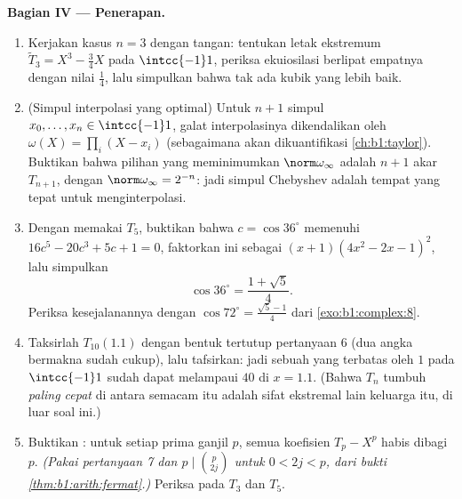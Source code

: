 \begin{problem}
\medskip
\noindent\textbf{Bagian IV --- Penerapan.}
\begin{enumerate}[resume]
  \item Kerjakan kasus $n = 3$ dengan tangan: tentukan letak ekstremum
        $\widetilde T_3 = X^3 - \frac34X$ pada $\intcc{-1}1$,
        periksa ekuiosilasi berlipat empatnya dengan nilai
        $\frac14$, lalu simpulkan bahwa tak ada kubik  yang lebih baik.
  \item (Simpul interpolasi yang optimal) Untuk $n + 1$ simpul $x_0,
        \dots, x_n \in \intcc{-1}1$, galat interpolasinya
        dikendalikan oleh $\omega(X) = \prod_i (X - x_i)$ (sebagaimana
        akan dikuantifikasi \cref{ch:b1:taylor}). Buktikan bahwa pilihan
        yang meminimumkan $\norm\omega_\infty$ adalah  $n + 1$
        akar $T_{n+1}$, dengan $\norm\omega_\infty = 2^{-n}$:
        jadi simpul Chebyshev adalah tempat yang tepat untuk menginterpolasi.
  \item Dengan memakai $T_5$, buktikan bahwa $c = \cos 36^\circ$ memenuhi
        $16c^5 - 20c^3 + 5c + 1 = 0$, faktorkan  ini sebagai
        $(x + 1)(4x^2 - 2x - 1)^2$, lalu simpulkan
        \[
        \cos 36^\circ = \frac{1 + \sqrt5}4 .
        \]
        Periksa kesejalanannya dengan $\cos 72^\circ =
        \frac{\sqrt5 - 1}4$ dari \cref{exo:b1:complex:8}.
  \item Taksirlah $T_{10}(1.1)$ dengan bentuk tertutup pertanyaan 6
        (dua angka bermakna sudah cukup), lalu tafsirkan: jadi sebuah
         yang terbatas oleh $1$ pada $\intcc{-1}1$ sudah dapat
        melampaui $40$ di $x = 1.1$. (Bahwa $T_n$ tumbuh
        \emph{paling cepat} di antara  semacam itu adalah
        sifat ekstremal lain keluarga itu, di luar soal ini.)
  \item Buktikan : untuk setiap prima ganjil $p$, semua
        koefisien $T_p - X^p$ habis dibagi $p$.
        \emph{(Pakai pertanyaan 7 dan $p \mid \binom p{2j}$ untuk $0 <
        2j < p$, dari bukti
        \cref{thm:b1:arith:fermat}.)} Periksa pada $T_3$ dan $T_5$.
\end{enumerate}


\end{problem}
